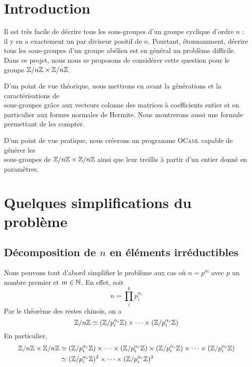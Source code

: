 \documentclass[11pt]{article}
\begin{document}

\tableofcontents
\newpage

\section{Introduction}
	Il est très facile de décrire tous les sous-groupes d'un groupe cyclique
	d'ordre $n$ : il y en a exactement un par diviseur positif de $n$.
	Pourtant, étonnamment, décrire tous les sous-groupes d'un groupe abélien
	est en général un problème difficile.\\
	Dans ce projet, nous nous se proposons de considérer cette question pour le groupe $\mathbb Z/n\mathbb Z \times \mathbb Z/n\mathbb Z$.

	D'un point de vue théorique, nous mettrons en avant la générations et la caractérisations de \\
	sous-groupes grâce aux vecteurs colonne des matrices à coefficients entier et en particulier aux formes
	normales de Hermite. Nous montrerons aussi une formule permettant de les compter.

	D'un point de vue pratique, nous créerons un programme \textsc{OCaml} capable de générer les\\
	sous-groupes de $\mathbb Z/n\mathbb Z \times \mathbb Z/n\mathbb Z$ ainsi que leur treillis à partir d'un entier donné en paramètres.


\section{Quelques simplifications du problème}
\subsection{Décomposition de $n$ en éléments irréductibles}
Nous pouvons tout d'abord simplifier le problème aux cas où $n = p^m$ avec $p$ un nombre premier
et $m \in \mathbb N$. En effet, soit
$$n = \prod_i^k p_i^{\alpha_i}$$
Par le théorème des restes chinois, on a
$$ \mathbb Z/n\mathbb Z \simeq (\mathbb Z/p_i^{\alpha_i}\mathbb Z) \times \cdots \times (\mathbb Z/p_i^{\alpha_i}\mathbb Z)$$
En particulier,
\begin{equation*}
	\begin{split}
		\mathbb Z/n\mathbb Z \times \mathbb Z/n\mathbb Z & \simeq
		(\mathbb Z/p_i^{\alpha_i}\mathbb Z) \times \cdots \times (\mathbb Z/p_i^{\alpha_i}\mathbb Z) \times (\mathbb Z/p_i^{\alpha_i}\mathbb Z) \times \cdots \times (\mathbb Z/p_i^{\alpha_i}\mathbb Z)\\
			& \simeq (\mathbb Z/p_i^{\alpha_i}\mathbb Z)^2 \times \cdots \times (\mathbb Z/p_i^{\alpha_i}\mathbb Z)^2
	\end{split}
\end{equation*}
\end{document}

